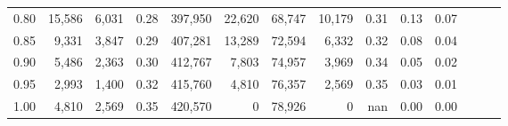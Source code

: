\begin{tabular}{rrrrrrrrrrrrrr}
0.80 &  15,586 &  6,031 &  0.28 &  397,950 &   22,620 &  68,747 &  10,179 &  0.31 &  0.13 &      0.07 \\
0.85 &   9,331 &  3,847 &  0.29 &  407,281 &   13,289 &  72,594 &   6,332 &  0.32 &  0.08 &      0.04 \\
0.90 &   5,486 &  2,363 &  0.30 &  412,767 &    7,803 &  74,957 &   3,969 &  0.34 &  0.05 &      0.02 \\
0.95 &   2,993 &  1,400 &  0.32 &  415,760 &    4,810 &  76,357 &   2,569 &  0.35 &  0.03 &      0.01 \\
1.00 &   4,810 &  2,569 &  0.35 &  420,570 &        0 &  78,926 &       0 &   nan &  0.00 &      0.00 \\
\bottomrule
\end{tabular}
